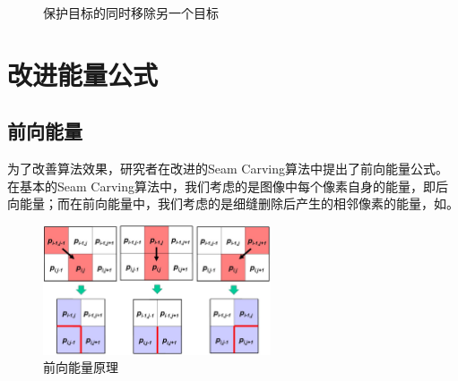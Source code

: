 \documentclass[11pt,a4paper]{article}
\begin{document}
\begin{figure}[H]
    \centering
    \caption{保护目标的同时移除另一个目标}
    \label{fig:protect_shoes}
\end{figure}

\section{改进能量公式}

\subsection{前向能量}

为了改善算法效果，研究者在改进的Seam Carving算法\cite{rubinstein2008improved}中提出了前向能量公式。在基本的Seam Carving算法中，我们考虑的是图像中每个像素自身的能量，即后向能量；而在前向能量中，我们考虑的是细缝删除后产生的相邻像素的能量，如。

\begin{figure}[H]
    \centering
    \includegraphics[width=0.6\textwidth]{../src/fig/forward_dp.jpg}
    \caption{前向能量原理}
    \label{fig:forward_dp}
\end{figure}
\end{document}
